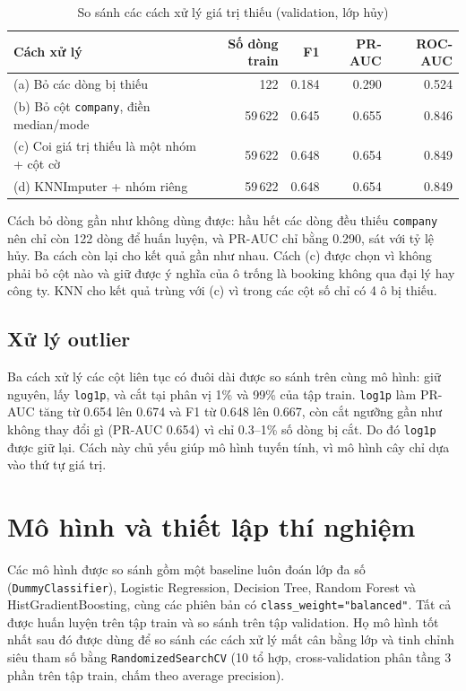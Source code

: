 \begin{table}[H]
\centering
\caption{So sánh các cách xử lý giá trị thiếu (validation, lớp hủy)}
\label{tab:tab-missing}
\begin{tabular}{lrrrr}
\toprule
Cách xử lý & Số dòng train & F1 & PR-AUC & ROC-AUC\\
\midrule
(a) Bỏ các dòng bị thiếu & 122 & 0.184 & 0.290 & 0.524\\
(b) Bỏ cột \texttt{company}, điền median/mode & 59\,622 & 0.645 & 0.655 & 0.846\\
(c) Coi giá trị thiếu là một nhóm + cột cờ & 59\,622 & 0.648 & 0.654 & 0.849\\
(d) KNNImputer + nhóm riêng & 59\,622 & 0.648 & 0.654 & 0.849\\
\bottomrule
\end{tabular}
\end{table}

Cách bỏ dòng gần như không dùng được: hầu hết các dòng đều thiếu \texttt{company} nên chỉ còn 122 dòng để huấn luyện,
và PR-AUC chỉ bằng 0.290, sát với tỷ lệ hủy. Ba cách còn lại cho kết quả gần như nhau. Cách (c) được chọn vì không phải bỏ cột nào
và giữ được ý nghĩa của ô trống là booking không qua đại lý hay công ty. KNN cho kết quả trùng với (c) vì trong các cột số
chỉ có 4 ô bị thiếu.

\subsection{Xử lý outlier}
Ba cách xử lý các cột liên tục có đuôi dài được so sánh trên cùng mô hình: giữ nguyên, lấy \texttt{log1p}, và cắt tại phân vị 1\% và 99\%
của tập train. \texttt{log1p} làm PR-AUC tăng từ 0.654 lên 0.674 và F1 từ 0.648 lên 0.667, còn cắt ngưỡng gần như không thay đổi gì
(PR-AUC 0.654) vì chỉ 0.3--1\% số dòng bị cắt. Do đó \texttt{log1p} được giữ lại. Cách này chủ yếu giúp mô hình tuyến tính,
vì mô hình cây chỉ dựa vào thứ tự giá trị.

\section{Mô hình và thiết lập thí nghiệm}
Các mô hình được so sánh gồm một baseline luôn đoán lớp đa số (\texttt{DummyClassifier}), Logistic Regression, Decision Tree,
Random Forest và HistGradientBoosting, cùng các phiên bản có \texttt{class\_weight="balanced"}. Tất cả được huấn luyện trên tập train
và so sánh trên tập validation. Họ mô hình tốt nhất sau đó được dùng để so sánh các cách xử lý mất cân bằng lớp và tinh chỉnh
siêu tham số bằng \texttt{RandomizedSearchCV} (10 tổ hợp, cross-validation phân tầng 3 phần trên tập train, chấm theo average precision).


